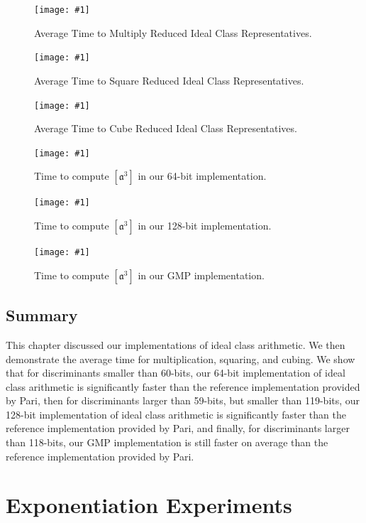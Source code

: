 \documentclass{ucalgthes1}
\theoremstyle{definition}
\newcommand{\mygraph}[3]{
	\begin{figure}[htb]
	\centering
	\texttt{[image: \#1]}
	\caption{#3}
	\label{#2}
	\end{figure}
}
\begin{document}
\mygraph{compose-all}{fig:idealCompose}{Average Time to Multiply Reduced Ideal Class Representatives.}
\mygraph{square-all}{fig:idealSquare}{Average Time to Square Reduced Ideal Class Representatives.}
\mygraph{cube-all}{fig:idealCube}{Average Time to Cube Reduced Ideal Class Representatives.}

\mygraph{cube-vs-64}{fig:cubingVs64}{Time to compute $[\mathfrak a^3]$ in our 64-bit implementation.}
\mygraph{cube-vs-128}{fig:cubingVs128}{Time to compute $[\mathfrak a^3]$ in our 128-bit implementation.}
\mygraph{cube-vs-mpz}{fig:cubingVsMpz}{Time to compute $[\mathfrak a^3]$ in our GMP implementation.}

\clearpage

\section{Summary}

This chapter discussed our implementations of ideal class arithmetic.  We then demonstrate the average time for multiplication, squaring, and cubing.  We show that for discriminants smaller than 60-bits, our 64-bit implementation of ideal class arithmetic is significantly faster than the reference implementation provided by Pari, then for discriminants larger than 59-bits, but smaller than 119-bits, our 128-bit implementation of ideal class arithmetic is significantly faster than the reference implementation provided by Pari, and finally, for discriminants larger than 118-bits, our GMP implementation is still faster on average than the reference implementation provided by Pari.


\chapter{Exponentiation Experiments}
\label{chap:powExperiments}



\end{document}
